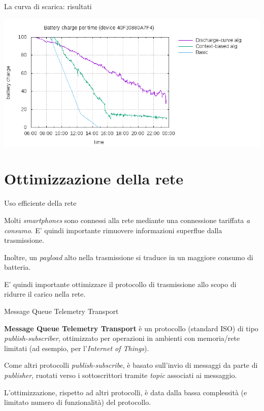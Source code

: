 \begin{frame}[c]{La curva di scarica: risultati}

\begin{center}
\includegraphics[width=\textwidth]{database/batteryplot}
\end{center}

\end{frame}

\section{Ottimizzazione della rete}

\begin{frame}[c]{Uso efficiente della rete}

Molti \textit{smartphones} sono connessi alla rete mediante una connessione tariffata \textit{a consumo}.
E' quindi importante rimuovere informazioni superflue dalla trasmissione.

\vspace{1cm}
Inoltre, un \textit{payload} alto nella trasmissione si traduce in un maggiore consumo di batteria.

\vspace{1cm}
E' quindi importante ottimizzare il protocollo di trasmissione allo scopo di ridurre il carico nella rete.

\end{frame}

\begin{frame}[c]{Message Queue Telemetry Transport}

\textbf{Message Queue Telemetry Transport} è un protocollo (standard ISO) di tipo \textit{publish-subscriber}, ottimizzato per operazioni in ambienti con memoria/rete limitati (ad esempio, per l'\textit{Internet of Things}).

\vspace{0.5cm}
Come altri protocolli \textit{publish-subscribe}, è basato sull'invio di messaggi da parte di \textit{publisher}, ruotati verso i sottoscrittori tramite \textit{topic} associati ai messaggio.

\vspace{0.5cm}
L'ottimizzazione, rispetto ad altri protocolli, è data dalla bassa complessità (e limitato numero di funzionalità) del protocollo.

\end{frame}

